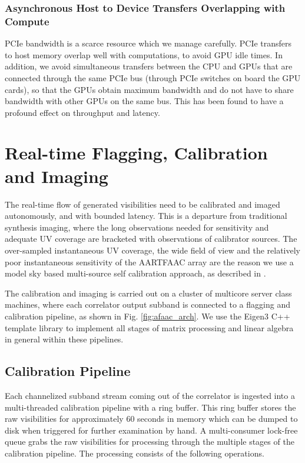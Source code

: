 \documentclass{ws-jai}
\begin{document}
\subsubsection  {Asynchronous  Host  to Device  Transfers  Overlapping  with  Compute}
 PCIe bandwidth is a scarce  resource which we manage carefully. PCIe
transfers  to host  memory overlap  well with  computations, to  avoid GPU  idle
times. In  addition, we avoid  simultaneous transfers  between the CPU  and GPUs
that are connected through the same PCIe bus (through PCIe switches on board the
GPU cards), so that  the GPUs obtain maximum bandwidth and do  not have to share
bandwidth  with other  GPUs on  the same  bus.  This has  been found  to have  a
profound effect on throughput and latency.\\

\section {\label{sec:calim} Real-time Flagging, Calibration and Imaging}
The real-time  flow of generated visibilities  need to be calibrated  and imaged
autonomously, and  with bounded latency.   This is a departure  from traditional
synthesis  imaging,  where the  long  observations  needed for  sensitivity  and
adequate UV coverage are bracketed  with observations of calibrator sources. The
over-sampled  instantaneous  UV  coverage,  the  wide  field  of  view  and  the
relatively poor instantaneous  sensitivity of the AARTFAAC array  are the reason
we use a model sky based multi-source self calibration approach, as described in
\cite {prasad2014real}.

The calibration  and imaging  is carried  out on a  cluster of  multicore server
class machines, where each correlator output  subband is connected to a flagging
and calibration  pipeline, as  shown in Fig.   \ref{fig:afaac_arch}. We  use the
Eigen3 \citep{eigenweb} C++  template library to implement all  stages of matrix
processing and linear algebra in general within these pipelines.\\

\subsection{Calibration Pipeline} Each channelized subband stream coming out of the
correlator  is  ingested  into  a  multi-threaded  calibration  pipeline  with  a
ring buffer. This ring buffer  stores the raw visibilities  for approximately $60$
seconds  in memory  which  can be  dumped  to disk  when  triggered for  further
examination by hand. A multi-consumer lock-free queue grabs the raw visibilities
for  processing through  the multiple  stages of  the calibration  pipeline. The
processing consists of the following operations.\\
\end{document}
